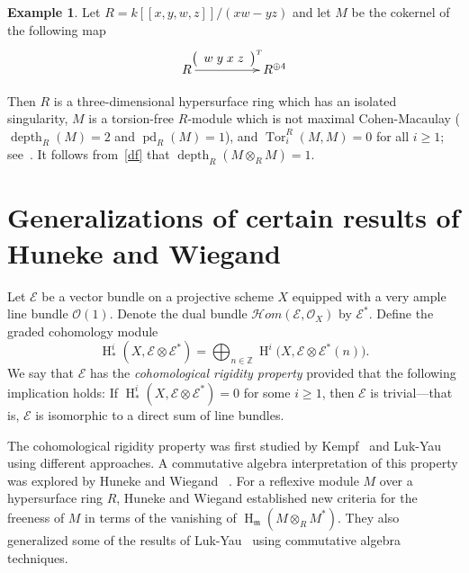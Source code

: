 \documentclass[11pt]{amsart}
\theoremstyle{definition}
\theoremstyle{definition}
\newtheorem{eg}[thm]{Example}
\numberwithin{equation}{section}
\newcommand{\fm}{\mathfrak{m}}
\DeclareMathOperator{\depth}{depth}
\DeclareMathOperator{\hh}{H}
\DeclareMathOperator{\pd}{pd}
\DeclareMathOperator{\Tor}{Tor}
\begin{document}
\begin{eg} Let $R=k[\![x,y,w,z]\!]/(xw-yz)$ and let $M$ be the cokernel of the following map
\[
\xymatrixcolsep{13pt}
\xymatrix{
R \ar[rrr]^-{\left( \begin{array}{c} w\; y\; x\; z \end{array} \right)^T} &&& R^{\oplus 4}
}
\]

Then $R$ is a three-dimensional hypersurface ring which has an isolated singularity, $M$ is a torsion-free $R$-module which is not maximal Cohen-Macaulay ($\depth_R(M)=2$ and $\pd_R(M)=1$), and $\Tor^{R}_{i}(M,M)=0$ for all $i\geq 1$; see~\cite[4.5]{Ce}. It follows from~\ref{df} that $\depth_R(M\otimes_RM)=1$.
\end{eg}


\section{Generalizations of certain results of Huneke and Wiegand} \label{section5}

Let $\mathcal{E}$ be a vector bundle on a projective scheme $X$ equipped with a very ample line bundle $\mathcal{O}(1)$. Denote the dual bundle $\mathcal{H}om(\mathcal{E}, \mathcal{O}_X)$ by $\mathcal{E}^*$. Define the graded cohomology module
\[
\hh^i_*(X, \mathcal{E} \otimes \mathcal{E}^*) = \bigoplus_{n \in \mathbb{Z}} \hh^i\big(X, \mathcal{E} \otimes \mathcal{E}^*(n)\big).
\]
We say that $\mathcal{E}$ has the \emph{cohomological rigidity property} provided that the following implication holds: If $\hh^i_*(X, \mathcal{E} \otimes \mathcal{E}^*) = 0$ for some $i \geq 1$, then $\mathcal{E}$ is trivial---that is, $\mathcal{E}$ is isomorphic to a direct sum of line bundles.

The cohomological rigidity property was first studied by Kempf~\cite{Kem} and Luk-Yau~\cite{Luk} using different approaches. A commutative algebra interpretation of this property was explored by Huneke and Wiegand~ \cite{HW2}. For a reflexive module $M$ over a hypersurface ring $R$, Huneke and Wiegand established new criteria for the freeness of $M$ in terms of the vanishing of $\hh_{\fm}(M \otimes_R M^\ast)$. They also generalized some of the results of Luk-Yau~\cite{Luk} using commutative algebra techniques.
\end{document}
